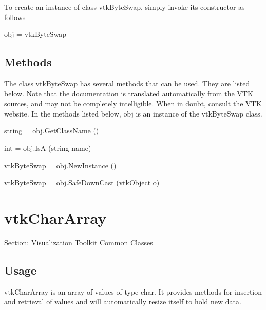 To create an instance of class vtk\-Byte\-Swap, simply invoke its constructor as follows \begin{DoxyVerb}  obj = vtkByteSwap
\end{DoxyVerb}
 \hypertarget{vtkwidgets_vtkxyplotwidget_Methods}{}\subsection{Methods}\label{vtkwidgets_vtkxyplotwidget_Methods}
The class vtk\-Byte\-Swap has several methods that can be used. They are listed below. Note that the documentation is translated automatically from the V\-T\-K sources, and may not be completely intelligible. When in doubt, consult the V\-T\-K website. In the methods listed below, {\ttfamily obj} is an instance of the vtk\-Byte\-Swap class. 
\begin{DoxyItemize}
\item {\ttfamily string = obj.\-Get\-Class\-Name ()}  
\item {\ttfamily int = obj.\-Is\-A (string name)}  
\item {\ttfamily vtk\-Byte\-Swap = obj.\-New\-Instance ()}  
\item {\ttfamily vtk\-Byte\-Swap = obj.\-Safe\-Down\-Cast (vtk\-Object o)}  
\end{DoxyItemize}\hypertarget{vtkcommon_vtkchararray}{}\section{vtk\-Char\-Array}\label{vtkcommon_vtkchararray}
Section\-: \hyperlink{sec_vtkcommon}{Visualization Toolkit Common Classes} \hypertarget{vtkwidgets_vtkxyplotwidget_Usage}{}\subsection{Usage}\label{vtkwidgets_vtkxyplotwidget_Usage}
vtk\-Char\-Array is an array of values of type char. It provides methods for insertion and retrieval of values and will automatically resize itself to hold new data.

